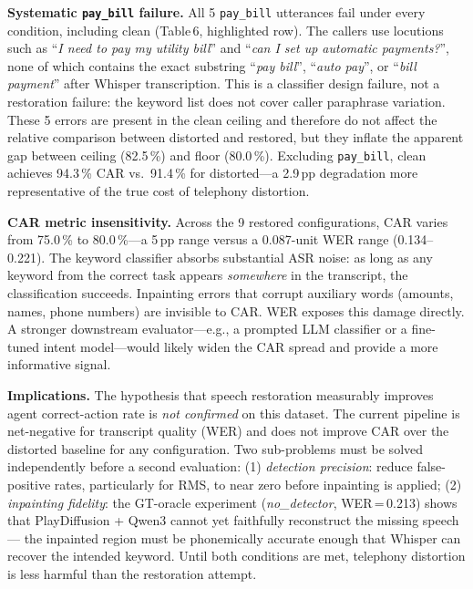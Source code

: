 \documentclass[9pt,twocolumn]{article}
\begin{document}
\noindent\textbf{Systematic \texttt{pay\_bill} failure.}
All 5 \texttt{pay\_bill} utterances fail under every condition,
including clean (Table\,6, highlighted row).
The callers use locutions such as
``\textit{I need to pay my utility bill}'' and
``\textit{can I set up automatic payments?}'',
none of which contains the exact substring
``\textit{pay bill}'', ``\textit{auto pay}'', or ``\textit{bill payment}''
after Whisper transcription.
This is a classifier design failure, not a restoration failure: the
keyword list does not cover caller paraphrase variation.
These 5 errors are present in the clean ceiling and therefore do not
affect the relative comparison between distorted and restored, but they
inflate the apparent gap between ceiling (82.5\,\%) and floor (80.0\,\%).
Excluding \texttt{pay\_bill}, clean achieves 94.3\,\% CAR vs.\
91.4\,\% for distorted---a 2.9\,pp degradation more representative
of the true cost of telephony distortion.

\noindent\textbf{CAR metric insensitivity.}
Across the 9 restored configurations, CAR varies from 75.0\,\% to
80.0\,\%---a 5\,pp range versus a 0.087-unit WER range
(0.134--0.221).
The keyword classifier absorbs substantial ASR noise: as long as any
keyword from the correct task appears \emph{somewhere} in the
transcript, the classification succeeds.
Inpainting errors that corrupt auxiliary words (amounts, names, phone
numbers) are invisible to CAR.
WER exposes this damage directly.
A stronger downstream evaluator---e.g., a prompted LLM classifier or
a fine-tuned intent model---would likely widen the CAR spread and
provide a more informative signal.

\noindent\textbf{Implications.}
The hypothesis that speech restoration measurably improves agent
correct-action rate is \emph{not confirmed} on this dataset.
The current pipeline is net-negative for transcript quality (WER)
and does not improve CAR over the distorted baseline for any
configuration.
Two sub-problems must be solved independently before a second
evaluation:
(1) \emph{detection precision}: reduce false-positive rates,
particularly for RMS, to near zero before inpainting is applied;
(2) \emph{inpainting fidelity}: the GT-oracle experiment
(\textit{no\_detector}, WER\,=\,0.213) shows that PlayDiffusion +
Qwen3 cannot yet faithfully reconstruct the missing speech---
the inpainted region must be phonemically accurate enough that
Whisper can recover the intended keyword.
Until both conditions are met, telephony distortion is less
harmful than the restoration attempt.
\end{document}
